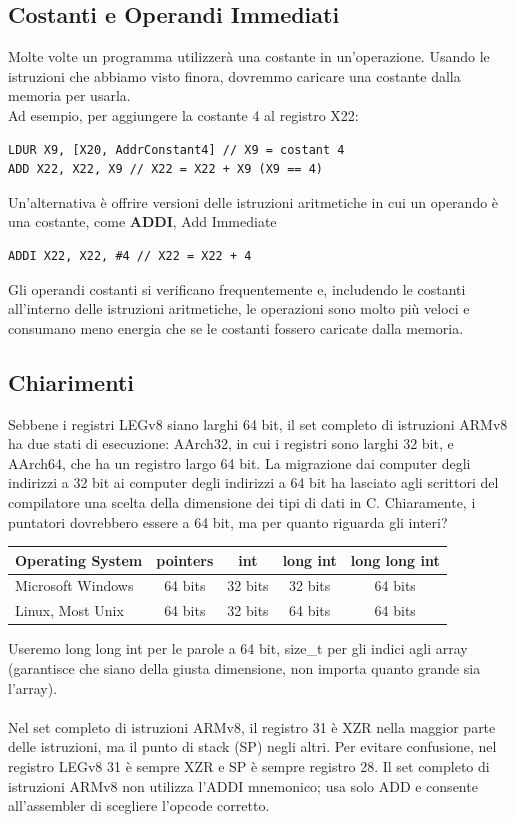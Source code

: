 \documentclass[12pt,a4paper]{article}
\begin{document}
\subsection{Costanti e Operandi Immediati}
Molte volte un programma utilizzerà una costante in un'operazione. Usando le istruzioni che abbiamo visto finora, dovremmo caricare una costante dalla memoria per usarla.\\
Ad esempio, per aggiungere la costante 4 al registro X22:
\begin{verbatim}
LDUR X9, [X20, AddrConstant4] // X9 = costant 4
ADD X22, X22, X9 // X22 = X22 + X9 (X9 == 4)
\end{verbatim}
Un'alternativa è offrire versioni delle istruzioni aritmetiche in cui un operando è una costante, come \textbf{ADDI}, Add Immediate
\begin{center}
\begin{minipage}{.4\linewidth}
\begin{verbatim}
ADDI X22, X22, #4 // X22 = X22 + 4
\end{verbatim}
\end{minipage}
\end{center}
Gli operandi costanti si verificano frequentemente e, includendo le costanti all'interno delle istruzioni aritmetiche, le operazioni sono molto più veloci e consumano meno energia che se le costanti fossero caricate dalla memoria.

\subsection{Chiarimenti}
Sebbene i registri LEGv8 siano larghi 64 bit, il set completo di istruzioni ARMv8 ha due stati di esecuzione: AArch32, in cui i registri sono larghi 32 bit, e AArch64, che ha un registro largo 64 bit. La migrazione dai computer degli indirizzi a 32 bit ai computer degli indirizzi a 64 bit ha lasciato agli scrittori del compilatore una scelta della dimensione dei tipi di dati in C. Chiaramente, i puntatori dovrebbero essere a 64 bit, ma per quanto riguarda gli interi?
\begin{center}
\begin{tabular}{|l|c|c|c|c|}
\hline
\rowcolor[HTML]{FFC702} 
 Operating System & pointers & int & long int & long long int \\ \hline
 Microsoft Windows & 64 bits & 32 bits & 32 bits & 64 bits \\ \hline
 Linux, Most Unix & 64 bits & 32 bits & 64 bits & 64 bits \\ \hline
\end{tabular}
\end{center}
Useremo long long int per le parole a 64 bit, size\_t per gli indici agli array (garantisce che siano della giusta dimensione, non importa quanto grande sia l'array).\\
\\
Nel set completo di istruzioni ARMv8, il registro 31 è XZR nella maggior parte delle istruzioni, ma il punto di stack (SP) negli altri. Per evitare confusione, nel registro LEGv8 31 è sempre XZR e SP è sempre registro 28. Il set completo di istruzioni ARMv8 non utilizza l'ADDI mnemonico; usa solo ADD e consente all'assembler di scegliere l'opcode corretto.
\end{document}

